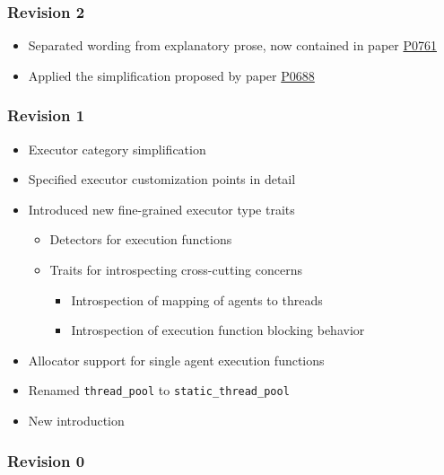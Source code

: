 \documentclass[a4paper,12pt,notitlepage,twoside,openright]{article}
\begin{document}
\hypertarget{revision-2}{%
\subsubsection{Revision 2}\label{revision-2}}

\begin{itemize}

\item
  Separated wording from explanatory prose, now contained in paper
  \href{https://wg21.link/P0761}{P0761}
\item
  Applied the simplification proposed by paper
  \href{https://wg21.link/P0688}{P0688}
\end{itemize}

\hypertarget{revision-1}{%
\subsubsection{Revision 1}\label{revision-1}}

\begin{itemize}

\item
  Executor category simplification
\item
  Specified executor customization points in detail
\item
  Introduced new fine-grained executor type traits

  \begin{itemize}

  \item
    Detectors for execution functions
  \item
    Traits for introspecting cross-cutting concerns

    \begin{itemize}

    \item
      Introspection of mapping of agents to threads
    \item
      Introspection of execution function blocking behavior
    \end{itemize}
  \end{itemize}
\item
  Allocator support for single agent execution functions
\item
  Renamed \texttt{thread_pool} to
  \texttt{static_thread_pool}
\item
  New introduction
\end{itemize}

\hypertarget{revision-0}{%
\subsubsection{Revision 0}\label{revision-0}}
\end{document}
